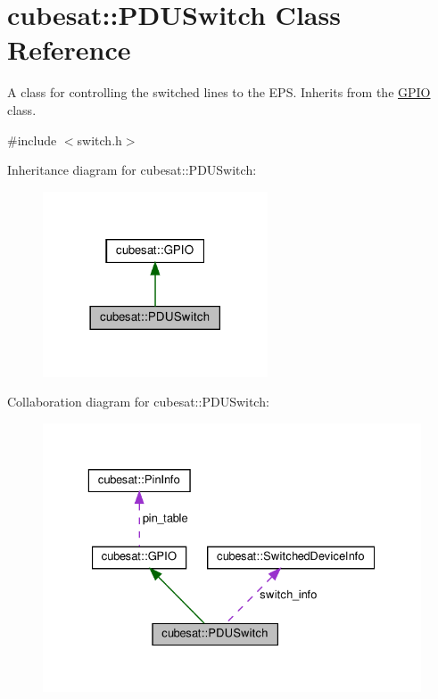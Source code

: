 \hypertarget{classcubesat_1_1PDUSwitch}{}\section{cubesat\+:\+:P\+D\+U\+Switch Class Reference}
\label{classcubesat_1_1PDUSwitch}


A class for controlling the switched lines to the E\+PS. Inherits from the \hyperlink{classcubesat_1_1GPIO}{G\+P\+IO} class.  




{\ttfamily \#include $<$switch.\+h$>$}



Inheritance diagram for cubesat\+:\+:P\+D\+U\+Switch\+:\nopagebreak
\begin{figure}[H]
\begin{center}
\leavevmode
\includegraphics[width=189pt]{classcubesat_1_1PDUSwitch__inherit__graph}
\end{center}
\end{figure}


Collaboration diagram for cubesat\+:\+:P\+D\+U\+Switch\+:\nopagebreak
\begin{figure}[H]
\begin{center}
\leavevmode
\includegraphics[width=329pt]{classcubesat_1_1PDUSwitch__coll__graph}
\end{center}
\end{figure}
